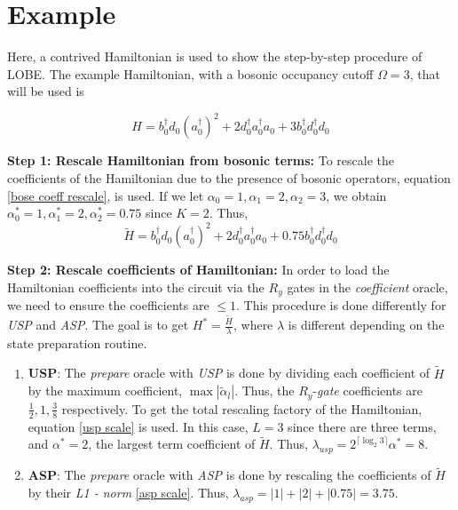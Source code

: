 \section{Example}
\label{subsec:example}
Here, a contrived Hamiltonian is used to show the step-by-step procedure of LOBE. The example Hamiltonian, with a bosonic occupancy cutoff $\Omega = 3$, that will be used is 

\begin{equation}
    \label{ex}
    H = b_0^\dagger d_0(a_0^\dagger)^2 + 2 d_0^\dagger a_0^\dagger a_0+3 b_0^\dagger d_0^\dagger d_0
\end{equation}

\textbf{Step 1: Rescale Hamiltonian from bosonic terms:}
To rescale the coefficients of the Hamiltonian due to the presence of bosonic operators, equation \ref{bose coeff rescale}, is used. If we let $\alpha_0 = 1, \alpha_1 = 2, \alpha_2 = 3$, we obtain  $\alpha_0^* = 1,\alpha_1^* = 2, \alpha_2^* = 0.75$ since $K = 2$. Thus,
\begin{equation}
    \tilde{H} = b_0^\dagger d_0(a_0^\dagger)^2 + 2 d_0^\dagger a_0^\dagger a_0+0.75 b_0^\dagger d_0^\dagger d_0
\end{equation}

\textbf{Step 2: Rescale coefficients of Hamiltonian:} In order to load the Hamiltonian coefficients into the circuit via the $R_y$ gates in the \textit{coefficient} oracle, we need to ensure the coefficients are $\leq 1$. This procedure is done differently for \textit{USP} and \textit{ASP}. The goal is to get $H^* = \frac{\tilde{H}}{\lambda}$, where $\lambda$ is different depending on the state preparation routine.
\begin{enumerate}
    \item \textbf{USP}: The \textit{prepare} oracle with \textit{USP} is done by dividing each coefficient of $\tilde{H}$ by the maximum coefficient, $\max{|\tilde{\alpha}_l|}$. Thus, the $R_y$-\textit{gate} coefficients are $\frac{1}{2}, 1, \frac{3}{8}$ respectively. To get the total rescaling factory of the Hamiltonian, equation \ref{usp scale} is used. In this case, $L = 3$ since there are three terms, and $\alpha^* = 2$, the largest term coefficient of $\tilde{H}$. Thus, $\lambda_{usp} = 2^{\lceil \log_2{3} \rceil}\alpha^* = 8$. 
    \item \textbf{ASP}: The \textit{prepare} oracle with \textit{ASP} is done by rescaling the coefficients of $\tilde{H}$ by their \textit{L1 - norm} \ref{asp scale}. Thus, $\lambda_{asp} = |1| + |2| + |0.75| = 3.75$.
\end{enumerate}

